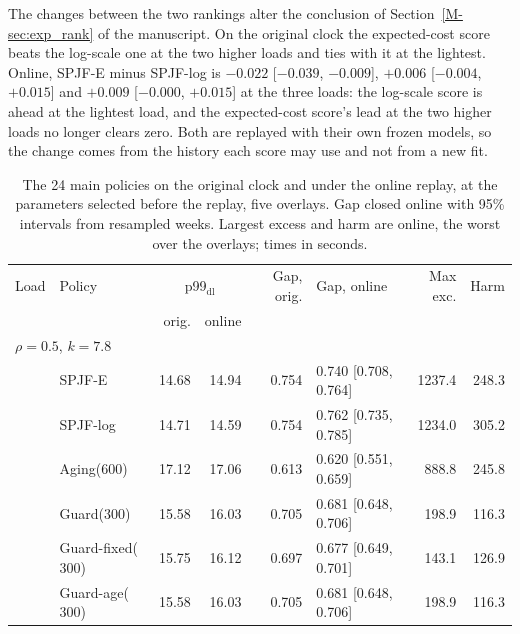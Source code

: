 \documentclass[mathematics,supfile,submit,moreauthors]{Definitions/mdpi}
\newcommand{\devnum}[1]{#1}
\begin{document}
The changes between the two rankings alter the conclusion of
Section~\ref*{M-sec:exp_rank} of the manuscript. On the original clock the
expected-cost score beats the log-scale one at the two higher loads and ties with it at the
lightest. Online, SPJF-E minus SPJF-log is \devnum{$-0.022$ [$-0.039$, $-0.009$]},
\devnum{$+0.006$ [$-0.004$, $+0.015$]} and \devnum{$+0.009$ [$-0.000$, $+0.015$]} at the
three loads: the log-scale score is ahead at the lightest load, and the expected-cost score's
lead at the two higher loads no longer clears zero. Both are replayed with their own frozen
models, so the change comes from the history each score may use and not from a new fit.

\begin{table}[p]
\centering
\scriptsize
\caption{The \devnum{24} main policies on the original clock and under the online replay,
at the parameters selected before the replay, five overlays. Gap closed online with
\devnum{95\%} intervals from resampled weeks. Largest excess and harm are online, the worst
over the overlays; times in seconds.}
\label{tab:s_online_suite}
\setlength{\tabcolsep}{3pt}
\begin{tabular}{llrrrlrr}
\toprule
Load & Policy & \multicolumn{2}{c}{p99$_{\mathrm{dl}}$} & Gap, orig. & Gap, online & Max exc. & Harm \\
 & & orig. & online & & & & \\
\midrule
\multicolumn{8}{l}{$\rho = \devnum{0.5}$, $k = \devnum{7.8}$} \\
 & SPJF-E                 & \devnum{14.68} & \devnum{14.94} & \devnum{0.754} & \devnum{0.740 [0.708, 0.764]} & \devnum{1237.4} & \devnum{248.3} \\
 & SPJF-log               & \devnum{14.71} & \devnum{14.59} & \devnum{0.754} & \devnum{0.762 [0.735, 0.785]} & \devnum{1234.0} & \devnum{305.2} \\
 & Aging($\devnum{600}$)  & \devnum{17.12} & \devnum{17.06} & \devnum{0.613} & \devnum{0.620 [0.551, 0.659]} & \devnum{888.8} & \devnum{245.8} \\
 & Guard($\devnum{300}$)  & \devnum{15.58} & \devnum{16.03} & \devnum{0.705} & \devnum{0.681 [0.648, 0.706]} & \devnum{198.9} & \devnum{116.3} \\
 & Guard-fixed($\devnum{300}$) & \devnum{15.75} & \devnum{16.12} & \devnum{0.697} & \devnum{0.677 [0.649, 0.701]} & \devnum{143.1} & \devnum{126.9} \\
 & Guard-age($\devnum{300}$) & \devnum{15.58} & \devnum{16.03} & \devnum{0.705} & \devnum{0.681 [0.648, 0.706]} & \devnum{198.9} & \devnum{116.3} \\

\end{tabular}
\end{table}
\end{document}
